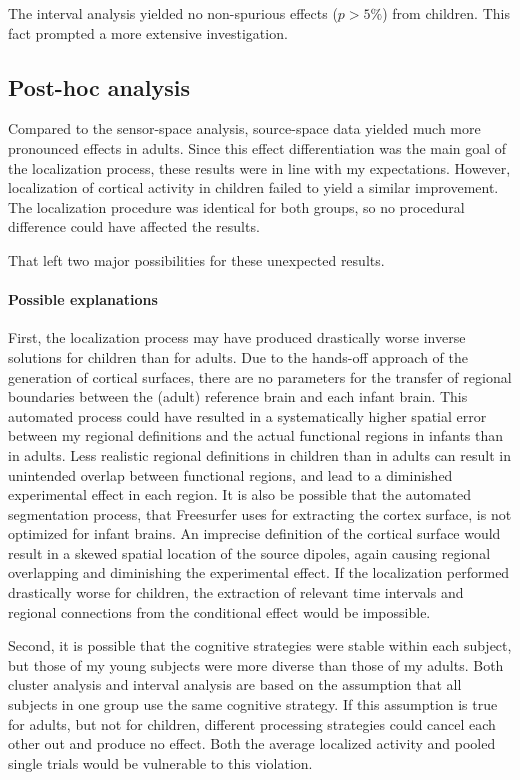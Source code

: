 \clearpage

The interval analysis yielded no non-spurious effects ($p > 5\%$) from children.
This fact prompted a more extensive investigation.

\subsection{Post-hoc analysis}

Compared to the sensor-space analysis, source-space data yielded much more pronounced effects in adults.
Since this effect differentiation was the main goal of the localization process, these results were in line with my expectations.
However, localization of cortical activity in children failed to yield a similar improvement.
The localization procedure was identical for both groups, so no procedural difference could have affected the results.

That left two major possibilities for these unexpected results.

\paragraph{Possible explanations}
First, the localization process may have produced drastically worse inverse solutions for children than for adults.
Due to the hands-off approach of the generation of cortical surfaces, there are no parameters for the transfer of regional boundaries between the (adult) reference brain and each infant brain.
This automated process could have resulted in a systematically higher spatial error between my regional definitions and the actual functional regions in infants than in adults.
Less realistic regional definitions in children than in adults can result in unintended overlap between functional regions, and lead to a diminished experimental effect in each region.
It is also be possible that the automated segmentation process, that Freesurfer uses for extracting the cortex surface, is not optimized for infant brains.
An imprecise definition of the cortical surface would result in a skewed spatial location of the source dipoles, again causing regional overlapping and diminishing the experimental effect.
If the localization performed drastically worse for children, the extraction of relevant time intervals and regional connections from the conditional effect would be impossible.

Second, it is possible that the cognitive strategies were stable within each subject, but those of my young subjects were  more diverse than those of my adults.
Both cluster analysis and interval analysis are based on the assumption that all subjects in one group use the same cognitive strategy.
If this assumption is true for adults, but not for children, different processing strategies could cancel each other out and produce no effect.
Both the average localized activity and pooled single trials would be vulnerable to this violation.

